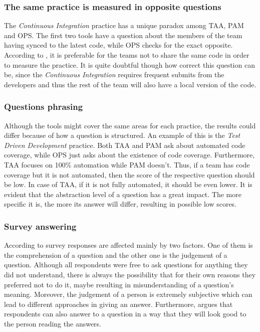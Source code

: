 \subsubsection{The same practice is measured in opposite questions}
\label{subsec:opposite_questions}
The \textit{Continuous Integration} practice has a unique paradox among \ac{TAA}, \ac{PAM} and \ac{OPS}. The first two tools have a question about the members of the team having synced to the latest code, while \ac{OPS} checks for the exact opposite. According to \citet{sventha_dissertation}, it is preferable for the teams not to share the same code in order to measure the practice. It is quite doubtful though how correct this question can be, since the \textit{Continuous Integration} requires frequent submits from the developers and thus the rest of the team will also have a local version of the code.

\subsubsection{Questions phrasing}
Although the tools might cover the same areas for each practice, the results could differ because of how a question is structured. An example of this is the \textit{Test Driven Development} practice. Both \ac{TAA} and \ac{PAM} ask about automated code coverage, while \ac{OPS} just asks about the existence of code coverage. Furthermore, \ac{TAA} focuses on 100\% automation while \ac{PAM} doesn’t. Thus, if a team has code coverage but it is not automated, then the score of the respective question should be low. In case of \ac{TAA}, if it is not fully automated, it should be even lower. It is evident that the abstraction level of a question has a great impact. The more specific it is, the more its answer will differ, resulting in possible low scores.

\subsubsection{Survey answering}
According to \citet{Wagner_Zeglovits} survey responses are affected mainly by two factors. One of them is the comprehension of a question and the other one is the judgement of a question. Although all respondents were free to ask questions for anything they did not understand, there is always the possibility that for their own reasons they preferred not to do it, maybe resulting in misunderstanding of a question's meaning. Moreover, the judgement of a person is extremely subjective which can lead to different approaches in giving an answer. Furthermore, \citet{Floyd_Fowler} argues that respondents can also answer to a question in a way that they will look good to the person reading the answers. 

